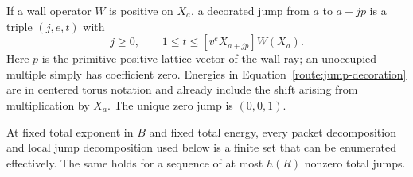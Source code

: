 If a wall operator $W$ is positive on $X_a$, a decorated jump from $a$
to $a+jp$ is a triple $(j,e,t)$ with
\begin{equation}
 \label{route:jump-decoration}
 j\geq0,\qquad
 1\leq t\leq [v^eX_{a+jp}]W(X_a).
\end{equation}
Here $p$ is the primitive positive lattice vector of the wall ray; an
unoccupied multiple simply has coefficient zero.  Energies in
Equation~\eqref{route:jump-decoration} are in centered torus notation and already
include the shift arising from multiplication by $X_a$.  The unique
zero jump is $(0,0,1)$.

\begin{lemma}
\label{route:finite}
At fixed total exponent in $B$ and fixed total energy, every packet
decomposition and local jump decomposition used below is a finite set
that can be enumerated effectively.  The same holds for a sequence of at most
$h(R)$ nonzero total jumps.
\end{lemma}


